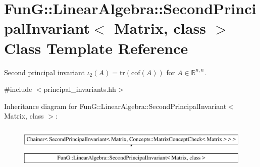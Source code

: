 \hypertarget{classFunG_1_1LinearAlgebra_1_1SecondPrincipalInvariant}{}\section{FunG\+:\+:Linear\+Algebra\+:\+:Second\+Principal\+Invariant$<$ Matrix, class $>$ Class Template Reference}
\label{classFunG_1_1LinearAlgebra_1_1SecondPrincipalInvariant}


Second principal invariant $ \iota_2(A)=\mathrm{tr}(\mathrm{cof}(A)) $ for $A\in\mathbb{R}^{n,n}$.  




{\ttfamily \#include $<$principal\+\_\+invariants.\+hh$>$}

Inheritance diagram for FunG\+:\+:Linear\+Algebra\+:\+:Second\+Principal\+Invariant$<$ Matrix, class $>$\+:\begin{figure}[H]
\begin{center}
\leavevmode
\includegraphics[height=2.000000cm]{classFunG_1_1LinearAlgebra_1_1SecondPrincipalInvariant}
\end{center}
\end{figure}
